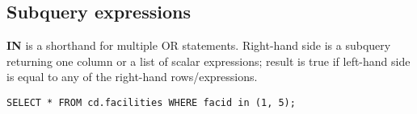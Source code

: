 %

\subsection{Subquery expressions}
\textbf{IN} is a shorthand for multiple OR statements.
Right-hand side is a subquery returning one column or a list of scalar expressions; result is true if left-hand side is equal to any of the right-hand rows/expressions.
\begin{verbatim}
SELECT * FROM cd.facilities WHERE facid in (1, 5);
\end{verbatim}

%
